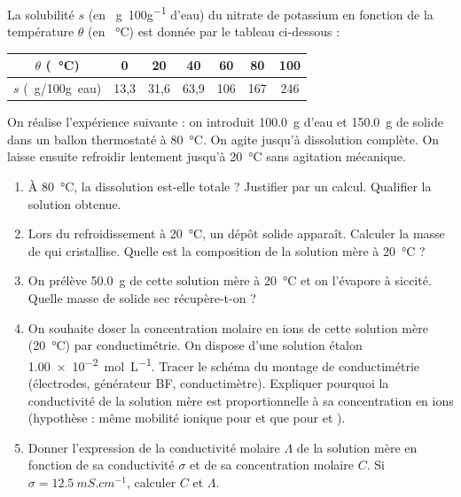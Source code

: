 \documentclass[11pt]{article}
\begin{document}
\begin{exercice}
La solubilité $s$ (en \SI{}{g.100g^{-1}} d'eau) du nitrate de potassium  en fonction de la température $\theta$ (en \SI{}{\celsius}) est donnée par le tableau ci-dessous :
\begin{center}
\begin{tabular}{|c|c|c|c|c|c|c|}
\hline $\theta$ (\SI{}{\celsius}) & 0 & 20 & 40 & 60 & 80 & 100 \\ \hline
$s$ (\SI{}{g/100g~eau}) & 13,3 & 31,6 & 63,9 & 106 & 167 & 246 \\ \hline
\end{tabular}
\end{center}
On réalise l'expérience suivante : on introduit \SI{100,0}{g} d'eau et \SI{150,0}{g} de  solide dans un ballon thermostaté à \SI{80}{\celsius}. On agite jusqu'à dissolution complète. On laisse ensuite refroidir lentement jusqu'à \SI{20}{\celsius} sans agitation mécanique.
\begin{enumerate}
    \item À \SI{80}{\celsius}, la dissolution est-elle totale ? Justifier par un calcul. Qualifier la solution obtenue.
    \item Lors du refroidissement à \SI{20}{\celsius}, un dépôt solide apparaît. Calculer la masse de  qui cristallise. Quelle est la composition de la solution mère à \SI{20}{\celsius} ? 
    \item On prélève \SI{50,0}{g} de cette solution mère à \SI{20}{\celsius} et on l'évapore à siccité. Quelle masse de solide sec récupère-t-on ? 
    \item On souhaite doser la concentration molaire en ions  de cette solution mère (\SI{20}{\celsius}) par conductimétrie. On dispose d'une solution étalon  \SI{1,00e-2}{mol.L^{-1}}. Tracer le schéma du montage de conductimétrie (électrodes, générateur BF, conductimètre). Expliquer pourquoi la conductivité de la solution mère est proportionnelle à sa concentration en ions  (hypothèse : même mobilité ionique pour  et  que pour  et ). 
    \item Donner l'expression de la conductivité molaire $\Lambda$ de la solution mère en fonction de sa conductivité $\sigma$ et de sa concentration molaire $C$. Si $\sigma = \SI{12,5}{mS.cm^{-1}}$, calculer $C$ et $\Lambda$.
\end{enumerate}
\end{exercice}
\end{document}
